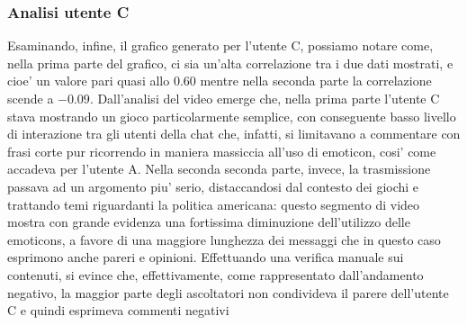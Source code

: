 \documentclass[a4paper,12pt,openright,twoside]{report}
\theoremstyle{definition}
\begin{document}
\subsubsection{Analisi utente C}
Esaminando, infine, il grafico generato per l'utente C, possiamo notare come, nella prima
parte del grafico, ci sia un'alta correlazione tra i due dati mostrati,
e cioe' un valore pari quasi allo $0.60$ mentre nella
seconda parte la correlazione scende a $-0.09$. 
Dall'analisi del video emerge che, nella prima parte l'utente C
stava mostrando un gioco particolarmente semplice, con conseguente basso livello di interazione tra gli utenti
della chat che, infatti, si limitavano a commentare con frasi corte
pur ricorrendo in maniera massiccia all'uso di emoticon, cosi' 
come accadeva per l'utente A. 
Nella seconda seconda parte, invece, la trasmissione passava ad un argomento piu' serio,
distaccandosi dal contesto dei giochi e trattando temi riguardanti la politica americana:
questo segmento di video mostra con grande evidenza una fortissima diminuzione dell'utilizzo
delle emoticons, a favore di una maggiore lunghezza dei messaggi che in questo caso
esprimono anche pareri e opinioni. 
Effettuando una verifica manuale sui contenuti,
si evince che, effettivamente, come rappresentato dall'andamento negativo, la maggior parte degli ascoltatori
non condivideva il parere dell'utente C e quindi esprimeva commenti negativi

\end{document}
